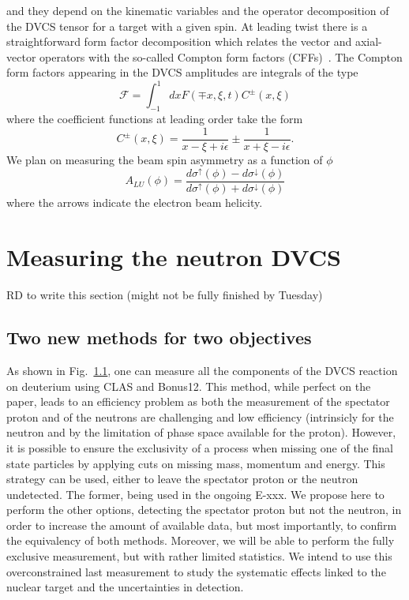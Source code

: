and they depend on the kinematic variables and the operator decomposition of 
the DVCS tensor for a target with a given spin. At leading twist there is a 
straightforward form factor decomposition which relates the vector and 
axial-vector operators with the so-called Compton form factors 
(CFFs)~\cite{Belitsky:2000gz}. The Compton form factors appearing in the DVCS 
amplitudes are integrals of the type
%
%
\begin{equation}
   \mathcal{F} = \int_{-1}^{1} dx F(\mp x,\xi,t) C^{\pm}(x,\xi)
\end{equation}
where the coefficient functions at leading order take the form
\begin{equation}
   C^{\pm}(x,\xi) = \frac{1}{x-\xi + i\epsilon} \pm \frac{1}{x+\xi - 
   i\epsilon}.
\end{equation}
%
We plan on measuring the beam spin asymmetry as a function of $\phi$
\begin{equation}
   A_{LU}(\phi) = \frac{d\sigma^{\uparrow}(\phi) - 
   d\sigma^{\downarrow}(\phi)}{d\sigma^{\uparrow}(\phi) + 
   d\sigma^{\downarrow}(\phi)}
\end{equation}
%
where the arrows indicate the electron beam helicity. 

\newpage

\section{Measuring the neutron DVCS}

RD to write this section (might not be fully finished by Tuesday)

\subsection{Two new methods for two objectives}

As shown in Fig.~\ref{}, one can measure all the components of the DVCS reaction 
on deuterium using CLAS and Bonus12. This method, while perfect on the paper, 
leads to an efficiency problem
as both the measurement of the spectator proton and of the neutrons are challenging
and low efficiency (intrinsicly for the neutron and by the limitation of phase 
space available for the proton). However, it is possible to ensure the exclusivity
of a process when missing one of the final state particles by applying cuts on
missing mass, momentum and energy. This strategy can be used, either to leave the
spectator proton or the neutron undetected. The former, being used in the ongoing
E-xxx. We propose here to perform the other options, detecting the spectator proton
but not the neutron, in order to increase the amount of available data, but most 
importantly, to confirm the equivalency of both methods. Moreover, we will be able to
perform the fully exclusive measurement, but with rather limited statistics. We
intend to use this overconstrained last measurement to study the systematic effects 
linked to the nuclear target and the uncertainties in detection.


